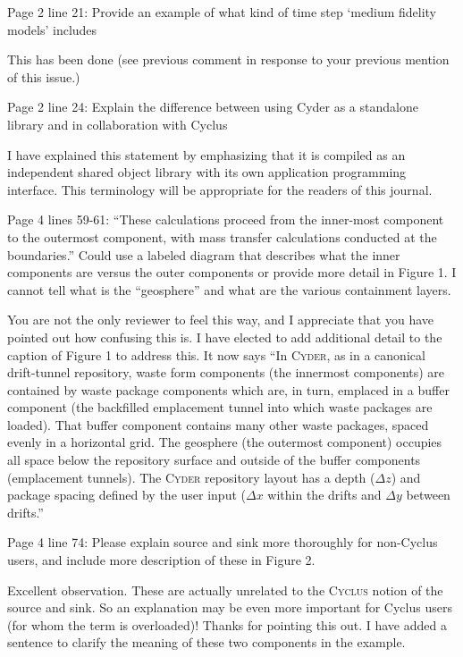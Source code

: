\documentclass[answers,12pt]{exam}
\newcommand{\Cyclus}{\textsc{Cyclus}\xspace}%
\newcommand{\Cyder}{\textsc{Cyder}\xspace}%
\begin{document}
\begin{questions}
\question Page 2 line 21:  Provide an example of what kind of time step `medium fidelity models' includes 
\begin{solution}
        This has been done (see previous comment in response to your previous 
        mention of this issue.)
\end{solution} 
 
\question Page  2  line  24:  Explain  the  difference  between  using  Cyder  as  a  standalone  library  and  in  collaboration  with Cyclus 
\begin{solution}
I have explained this statement by emphasizing that it is compiled as an 
        independent shared object library with its own application programming 
        interface. This terminology will be appropriate for the readers of this 
        journal.
\end{solution} 
 
\question Page  4  lines  59-61:  ``These  calculations  proceed  from  the  inner-most  component  to  the  outermost 
component,  with  mass  transfer  calculations  conducted  at  the  boundaries.'' Could  use  a  labeled  diagram 
that  describes  what  the  inner  components  are  versus  the  outer  components  or  provide  more  detail  in 
Figure 1. I cannot tell what is the ``geosphere'' and what are the various containment layers. 
\begin{solution}
You are not the only reviewer to feel this way, and I appreciate that you have 
pointed out how confusing this is. I have elected to add additional detail to 
        the caption of Figure 1 to address this. It now says ``In \Cyder, as in 
        a canonical drift-tunnel repository, waste form components (the 
        innermost components) are contained by waste package components which 
        are, in turn, emplaced in a buffer component (the backfilled 
        emplacement tunnel into which waste packages are loaded). That buffer 
        component contains many other waste packages, spaced evenly in a 
        horizontal grid.  The geosphere (the outermost component) occupies all 
        space below the repository surface and outside of the buffer components 
        (emplacement tunnels). The \Cyder repository layout has a depth 
        ($\Delta z$) and package spacing defined by the user input ($\Delta x$ 
        within the drifts and $\Delta y$ between drifts.''

\end{solution} 
 
\question Page  4  line  74:  Please  explain  source  and  sink  more  thoroughly  for  non-Cyclus  users,  and include more 
description of these in Figure 2.  
\begin{solution}
Excellent observation. These are actually unrelated to the \Cyclus notion of 
        the source and sink. So an explanation may be even more important for 
        Cyclus users (for whom the term is overloaded)! Thanks for 
        pointing this out. I have added a sentence to clarify the meaning of 
        these two components in the example.
\end{solution} 
 

\end{questions}
\end{document}
